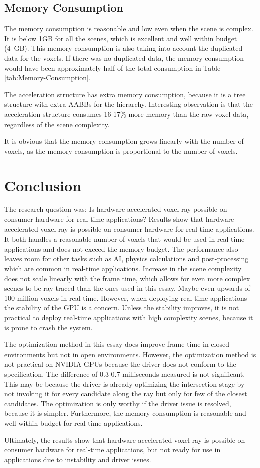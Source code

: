 \documentclass[12pt]{article}
\begin{document}
\subsection{Memory Consumption}

The memory consumption is reasonable and low even when the scene is complex.
It is below 1GB for all the scenes, which is excellent and well within budget (4 GB).
This memory consumption is also taking into account the duplicated data for the voxels.
If there was no duplicated data, the memory consumption would have been approximately half of the total consumption in Table \ref{tab:Memory-Consumption}.


The acceleration structure has extra memory consumption, because it is a tree structure
with extra AABBs for the hierarchy. Interesting observation is that the
acceleration structure consumes 16-17\% more memory than the raw voxel data,
regardless of the scene complexity.

It is obvious that the memory consumption grows linearly with the number of voxels,
as the memory consumption is proportional to the number of voxels.

\section{Conclusion}


The research question was: Is hardware accelerated voxel ray possible on consumer hardware for real-time applications?
Results show that hardware accelerated voxel ray is possible on consumer hardware for real-time applications.
It both handles a reasonable number of voxels that would be used in real-time applications and does not exceed the memory budget.
The performance also leaves room for other tasks such as AI, physics calculations and post-processing which are common in real-time applications.
Increase in the scene complexity does not scale linearly with the frame time, which allows for even more complex scenes
to be ray traced than the ones used in this essay. Maybe even upwards of 100 million voxels in real time.
However, when deploying real-time applications the stability of the GPU is a concern.
Unless the stability improves, it is not practical to deploy real-time applications with high complexity scenes,
because it is prone to crash the system.

The optimization method in this essay does improve frame time in closed environments but not in open environments.
However, the optimization method is not practical on NVIDIA GPUs because the driver does not conform to the specification.
The difference of 0.3-0.7 milliseconds measured is not significant. This may be because the driver is already optimizing the intersection stage by not invoking it for every candidate
along the ray but only for few of the closest candidates. The optimization is only worthy if the driver issue is resolved, because it is simpler.
Furthermore, the memory consumption is reasonable and well within budget for real-time applications.

Ultimately, the results show that hardware accelerated voxel ray is possible on consumer hardware for real-time applications,
but not ready for use in applications due to instability and driver issues.

\printbibliography
\end{document}
